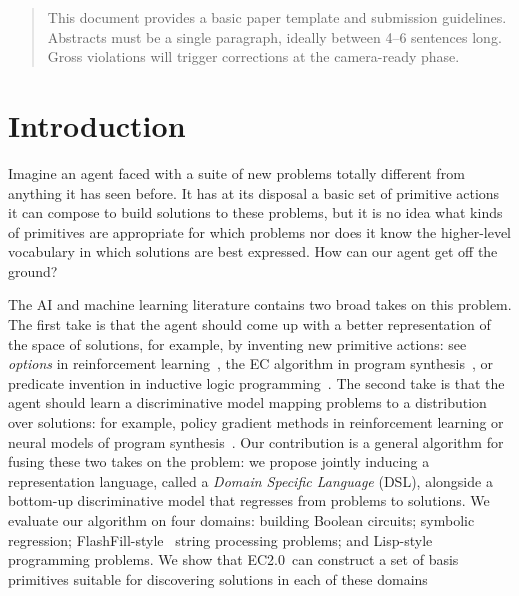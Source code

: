\documentclass{article}
\newcommand{\system}{EC2.0~}
\begin{document}
\printAffiliationsAndNotice{\icmlEqualContribution} %

\begin{abstract}
This document provides a basic paper template and submission guidelines.
Abstracts must be a single paragraph, ideally between 4--6 sentences long.
Gross violations will trigger corrections at the camera-ready phase.
\end{abstract}

\section{Introduction}

Imagine an agent faced with a suite of new problems totally different
from anything it has seen before. It has at its disposal a basic set
of primitive actions it can compose to build solutions to these problems, but
it is no idea what kinds of primitives are appropriate for which
problems nor does it know the higher-level vocabulary in
which solutions are best expressed.
How can our agent get off the ground?

The AI and machine learning literature contains two broad takes on this problem.
The first take is that the agent should come up with a better representation of the space of solutions,
for example, by inventing new primitive actions: see \emph{options} in reinforcement learning~\cite{stolle2002learning}, the EC algorithm in program synthesis~\cite{Dechter:2013:BLV:2540128.2540316}, or predicate invention in inductive logic programming~\cite{muggleton2015meta}.
The second take is that the agent should learn a discriminative model mapping problems to a distribution over solutions: for example, policy gradient methods in reinforcement learning or neural models of program synthesis~\cite{devlin2017robustfill,balog2016deepcoder}.
Our contribution is a general algorithm for fusing these two takes on the problem:
we propose jointly inducing a representation language, called a \emph{Domain Specific Language} (DSL),
alongside a bottom-up discriminative model that regresses from problems to solutions.
We evaluate our algorithm on four domains:
building Boolean circuits; symbolic regression; FlashFill-style~\cite{gulwani2011automating} string processing problems; and Lisp-style programming problems.
We show that \system can construct a set of basis primitives suitable for discovering solutions in each of these domains
\end{document}
